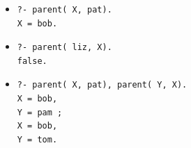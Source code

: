 
\begin{itemize}
    \item[(a)]
        \begin{verbatim}
?- parent( X, pat).
X = bob.
        \end{verbatim}
    \item[(b)]
        \begin{verbatim}
?- parent( liz, X).
false.
        \end{verbatim}
    \item[(c)]
        \begin{verbatim}
?- parent( X, pat), parent( Y, X).
X = bob,
Y = pam ;
X = bob,
Y = tom.
        \end{verbatim}
\end{itemize}
